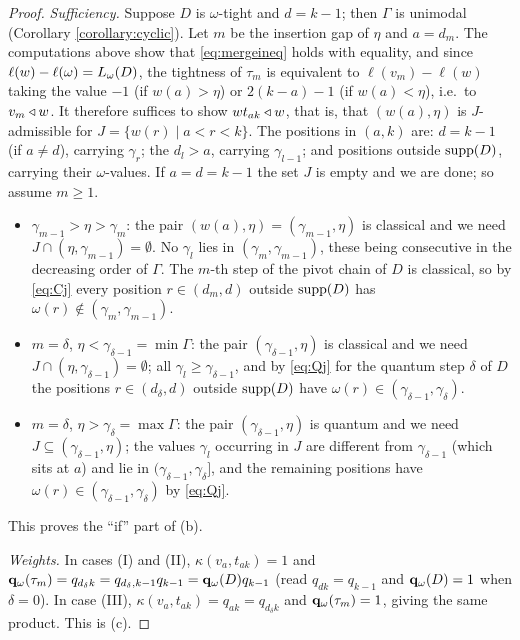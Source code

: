 \documentclass{amsart}
\theoremstyle{definition}
\theoremstyle{remark}
\numberwithin{equation}{section}
\begin{document}
\begin{proof}
\emph{Sufficiency.} Suppose $D$ is $\omega$-tight and $d=k-1$; then $\Gamma$ is unimodal (Corollary \ref{corollary:cyclic}). Let $m$ be the insertion gap of $\eta$ and $a=d_m$. The computations above show that \eqref{eq:mergeineq} holds with equality, and since $\ell(w)-\ell(\omega)=L_\omega(D)$, the tightness of $\tau_m$ is equivalent to $\ell(v_m)-\ell(w)$ taking the value $-1$ (if $w(a)>\eta$) or $2(k-a)-1$ (if $w(a)<\eta$), i.e.\ to $v_m\triangleleft w$. It therefore suffices to show $wt_{ak}\triangleleft w$, that is, that $(w(a),\eta)$ is $J$-admissible for $J=\{w(r)\mid a<r<k\}$. The positions in $(a,k)$ are: $d=k-1$ (if $a\neq d$), carrying $\gamma_r$; the $d_l>a$, carrying $\gamma_{l-1}$; and positions outside $\mathrm{supp}(D)$, carrying their $\omega$-values. If $a=d=k-1$ the set $J$ is empty and we are done; so assume $m\geq1$.
\begin{itemize}
\item[(I)] $\gamma_{m-1}>\eta>\gamma_m$: the pair $(w(a),\eta)=(\gamma_{m-1},\eta)$ is classical and we need $J\cap(\eta,\gamma_{m-1})=\emptyset$. No $\gamma_l$ lies in $(\gamma_m,\gamma_{m-1})$, these being consecutive in the decreasing order of $\Gamma$. The $m$-th step of the pivot chain of $D$ is classical, so by \eqref{eq:Cj} every position $r\in(d_m,d)$ outside $\mathrm{supp}(D)$ has $\omega(r)\notin(\gamma_m,\gamma_{m-1})$.
\item[(II)] $m=\delta$, $\eta<\gamma_{\delta-1}=\min\Gamma$: the pair $(\gamma_{\delta-1},\eta)$ is classical and we need $J\cap(\eta,\gamma_{\delta-1})=\emptyset$; all $\gamma_l\geq\gamma_{\delta-1}$, and by \eqref{eq:Qj} for the quantum step $\delta$ of $D$ the positions $r\in(d_\delta,d)$ outside $\mathrm{supp}(D)$ have $\omega(r)\in(\gamma_{\delta-1},\gamma_\delta)$.
\item[(III)] $m=\delta$, $\eta>\gamma_\delta=\max\Gamma$: the pair $(\gamma_{\delta-1},\eta)$ is quantum and we need $J\subseteq(\gamma_{\delta-1},\eta)$; the values $\gamma_l$ occurring in $J$ are different from $\gamma_{\delta-1}$ (which sits at $a$) and lie in $(\gamma_{\delta-1},\gamma_\delta]$, and the remaining positions have $\omega(r)\in(\gamma_{\delta-1},\gamma_\delta)$ by \eqref{eq:Qj}.
\end{itemize}
This proves the ``if'' part of (b).

\emph{Weights.} In cases (I) and (II), $\kappa(v_a,t_{ak})=1$ and $\mathbf{q}_\omega(\tau_m)=q_{d_\delta k}=q_{d_\delta,k-1}q_{k-1}=\mathbf{q}_\omega(D)q_{k-1}$ (read $q_{dk}=q_{k-1}$ and $\mathbf{q}_\omega(D)=1$ when $\delta=0$). In case (III), $\kappa(v_a,t_{ak})=q_{ak}=q_{d_\delta k}$ and $\mathbf{q}_\omega(\tau_m)=1$, giving the same product. This is (c).
\end{proof}
\end{document}
